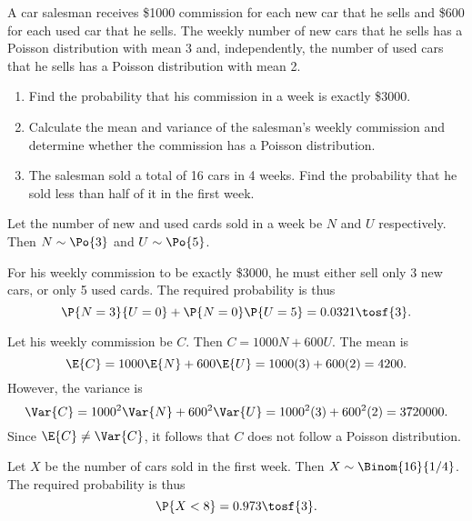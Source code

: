 \begin{problem}
    A car salesman receives \$1000 commission for each new car that he sells and \$600 for each used car that he sells. The weekly number of new cars that he sells has a Poisson distribution with mean 3 and, independently, the number of used cars that he sells has a Poisson distribution with mean 2.

    \begin{enumerate}
        \item Find the probability that his commission in a week is exactly \$3000.
        \item Calculate the mean and variance of the salesman's weekly commission and determine whether the commission has a Poisson distribution.
        \item The salesman sold a total of 16 cars in 4 weeks. Find the probability that he sold less than half of it in the first week.
    \end{enumerate}
\end{problem}
\begin{solution}
    Let the number of new and used cards sold in a week be $N$ and $U$ respectively. Then $N \sim \Po{3}$ and $U \sim \Po{5}$.

    \begin{ppart}
        For his weekly commission to be exactly \$3000, he must either sell only 3 new cars, or only 5 used cards. The required probability is thus \[\P{N = 3}{U = 0} + \P{N = 0}\P{U = 5} = 0.0321 \tosf{3}.\]
    \end{ppart}
    \begin{ppart}
        Let his weekly commission be $C$. Then $C = 1000 N + 600 U$. The mean is \[\E{C} = 1000\E{N} + 600\E{U} = 1000(3) + 600(2) = 4200.\] However, the variance is \[\Var{C} = 1000^2\Var{N} + 600^2\Var{U} = 1000^2 (3) + 600^2 (2) = 3720000.\] Since $\E{C} \neq \Var{C}$, it follows that $C$ does not follow a Poisson distribution.
    \end{ppart}
    \begin{ppart}
        Let $X$ be the number of cars sold in the first week. Then $X \sim \Binom{16}{1/4}$. The required probability is thus \[\P{X < 8} = 0.973 \tosf{3}.\]
    \end{ppart}
\end{solution}

